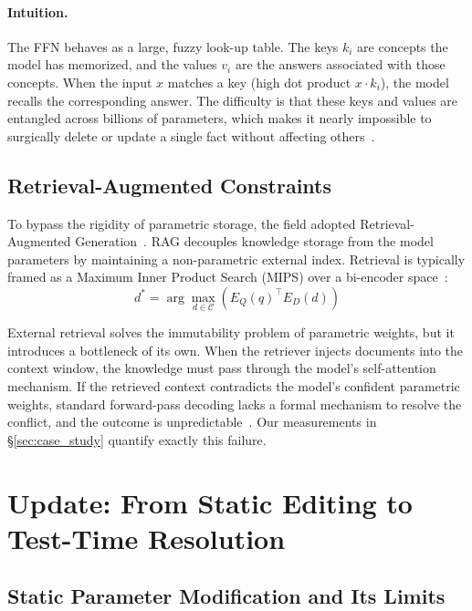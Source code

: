 \documentclass[manuscript, screen, review]{jair}
\begin{document}
\paragraph{Intuition.} The FFN behaves as a large, fuzzy look-up table. The keys $k_i$ are concepts the model has memorized, and the values $v_i$ are the answers associated with those concepts. When the input $x$ matches a key (high dot product $x \cdot k_i$), the model recalls the corresponding answer. The difficulty is that these keys and values are entangled across billions of parameters, which makes it nearly impossible to surgically delete or update a single fact without affecting others~\citep{yao2023editingsurvey}.

\subsection{Retrieval-Augmented Constraints}

To bypass the rigidity of parametric storage, the field adopted Retrieval-Augmented Generation~\citep{lewis2020rag}. RAG decouples knowledge storage from the model parameters by maintaining a non-parametric external index. Retrieval is typically framed as a Maximum Inner Product Search (MIPS) over a bi-encoder space~\citep{karpukhin2020dpr}:
\begin{equation}
  d^* = \arg\max_{d \in \mathcal{C}} \left( E_Q(q)^\top E_D(d) \right)
\end{equation}

External retrieval solves the immutability problem of parametric weights, but it introduces a bottleneck of its own. When the retriever injects documents into the context window, the knowledge must pass through the model's self-attention mechanism. If the retrieved context contradicts the model's confident parametric weights, standard forward-pass decoding lacks a formal mechanism to resolve the conflict, and the outcome is unpredictable~\citep{xie2024conflicts, longpre2021entity}. Our measurements in \S\ref{sec:case_study} quantify exactly this failure.

\section{Update: From Static Editing to Test-Time Resolution}
\label{sec:update}

\subsection{Static Parameter Modification and Its Limits}
\end{document}
